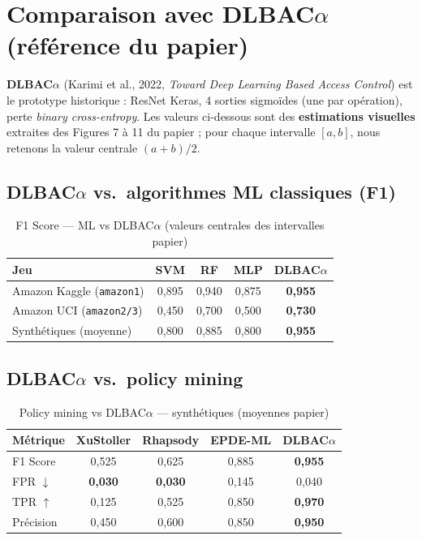 \documentclass[11pt,a4paper]{article}
\begin{document}
\section{Comparaison avec DLBAC$\alpha$ (référence du papier)}
\label{sec:dlbac-alpha}

\textbf{DLBAC$\alpha$} (Karimi et al., 2022, \emph{Toward Deep Learning Based Access Control}) est le prototype historique : ResNet Keras, 4 sorties sigmoïdes (une par opération), perte \emph{binary cross-entropy}. Les valeurs ci-dessous sont des \textbf{estimations visuelles} extraites des Figures 7 à 11 du papier ; pour chaque intervalle $[a,b]$, nous retenons la valeur centrale $(a+b)/2$.

\subsection{DLBAC$\alpha$ vs.\ algorithmes ML classiques (F1)}

\begin{table}[h]
\centering
\caption{F1 Score — ML vs DLBAC$\alpha$ (valeurs centrales des intervalles papier)}
\label{tab:paper-ml}
\small
\begin{tabular}{@{}lcccc@{}}
\toprule
\textbf{Jeu} & \textbf{SVM} & \textbf{RF} & \textbf{MLP} & \textbf{DLBAC$\alpha$} \\
\midrule
Amazon Kaggle (\texttt{amazon1}) & 0,895 & 0,940 & 0,875 & \textbf{0,955} \\
Amazon UCI (\texttt{amazon2/3}) & 0,450 & 0,700 & 0,500 & \textbf{0,730} \\
Synthétiques (moyenne) & 0,800 & 0,885 & 0,800 & \textbf{0,955} \\
\bottomrule
\end{tabular}
\end{table}

\subsection{DLBAC$\alpha$ vs.\ policy mining}

\begin{table}[h]
\centering
\caption{Policy mining vs DLBAC$\alpha$ — synthétiques (moyennes papier)}
\small
\begin{tabular}{@{}lcccc@{}}
\toprule
\textbf{Métrique} & \textbf{XuStoller} & \textbf{Rhapsody} & \textbf{EPDE-ML} & \textbf{DLBAC$\alpha$} \\
\midrule
F1 Score & 0,525 & 0,625 & 0,885 & \textbf{0,955} \\
FPR $\downarrow$ & \textbf{0,030} & \textbf{0,030} & 0,145 & 0,040 \\
TPR $\uparrow$ & 0,125 & 0,525 & 0,850 & \textbf{0,970} \\
Précision & 0,450 & 0,600 & 0,850 & \textbf{0,950} \\
\bottomrule
\end{tabular}
\end{table}
\end{document}
